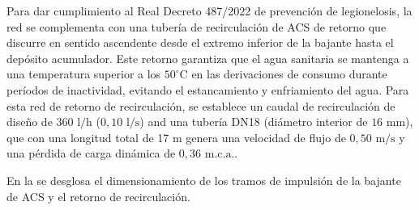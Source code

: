 \documentclass[12pt]{article}
\begin{document}
Para dar cumplimiento al Real Decreto 487/2022 de prevención de legionelosis, la red se complementa con una tubería de recirculación de ACS de retorno que discurre en sentido ascendente desde el extremo inferior de la bajante hasta el depósito acumulador. Este retorno garantiza que el agua sanitaria se mantenga a una temperatura superior a los $50^\circ\text{C}$ en las derivaciones de consumo durante períodos de inactividad, evitando el estancamiento y enfriamiento del agua. Para esta red de retorno de recirculación, se establece un caudal de recirculación de diseño de $360\text{ l/h}$ ($0,10\text{ l/s}$) and una tubería DN18 (diámetro interior de $16\text{ mm}$), que con una longitud total de 17 m genera una velocidad de flujo de $0,50\text{ m/s}$ y una pérdida de carga dinámica de $0,36\text{ m.c.a.}$.

En la  se desglosa el dimensionamiento de los tramos de impulsión de la bajante de ACS y el retorno de recirculación.
\end{document}
